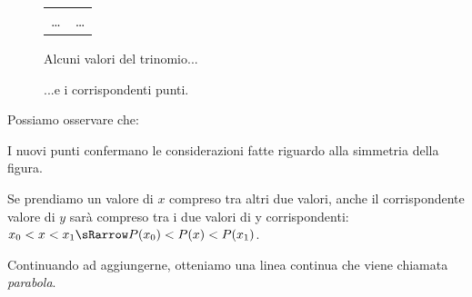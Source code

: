 \begin{figure}[h]
\begin{minipage}[]{.58\textwidth}
\begin{center}
\begin{tabular}{r|l}
    \dots & \dots \\
   \end{tabular}
  \caption{Alcuni valori del trinomio...} \label{tab:tabella1}
  \end{center}
\end{minipage}
\hfill
\begin{minipage}[]{.38\textwidth}
\begin{center}
\begin{inaccessibleblock}
\begin{center} \scalebox{.9}{\puntib} \end{center}
\caption{...e i corrispondenti punti.}\label{fig:trinomio1}
\end{inaccessibleblock}
\end{center}
\end{minipage}
\end{figure}

Possiamo osservare che:
\begin{enumerate*}
\item I nuovi punti confermano le considerazioni fatte riguardo 
alla simmetria della figura.
\item Se prendiamo un valore di \(x\) compreso tra altri due valori, anche 
il  corrispondente valore di \(y\) sarà compreso tra i due valori di y 
corrispondenti: \quad
\(x_0 < x <x_1 \sRarrow P(x_0) < P(x) < P(x_1)\).
\end{enumerate*}
Continuando ad aggiungerne, otteniamo una linea continua che viene 
chiamata \emph{parabola}.

